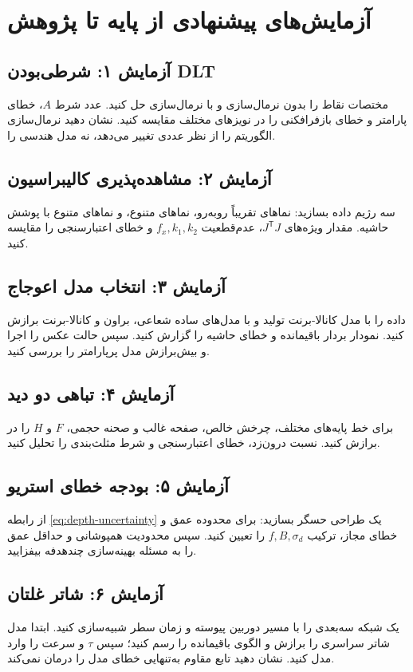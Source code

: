 \documentclass[12pt,openany,oneside]{book}
\newcommand{\trans}{^{\mathsf T}}
\begin{document}
\section{آزمایش‌های پیشنهادی از پایه تا پژوهش}

\subsection{آزمایش ۱: شرطی‌بودن DLT}
مختصات نقاط را بدون نرمال‌سازی و با نرمال‌سازی حل کنید. عدد شرط \(A\)، خطای پارامتر و خطای بازفرافکنی را در نویزهای مختلف
مقایسه کنید. نشان دهید نرمال‌سازی الگوریتم را از نظر عددی تغییر می‌دهد، نه مدل هندسی را.

\subsection{آزمایش ۲: مشاهده‌پذیری کالیبراسیون}
سه رژیم داده بسازید: نماهای تقریباً روبه‌رو، نماهای متنوع، و نماهای متنوع با پوشش حاشیه. مقدار ویژه‌های \(J\trans J\)،
عدم‌قطعیت \(f_x,k_1,k_2\) و خطای اعتبارسنجی را مقایسه کنید.

\subsection{آزمایش ۳: انتخاب مدل اعوجاج}
داده را با مدل کانالا-برنت تولید و با مدل‌های ساده شعاعی، براون و کانالا-برنت برازش کنید. نمودار بردار باقیمانده و خطای
حاشیه را گزارش کنید. سپس حالت عکس را اجرا و بیش‌برازش مدل پرپارامتر را بررسی کنید.

\subsection{آزمایش ۴: تباهی دو دید}
برای خط پایه‌های مختلف، چرخش خالص، صفحه غالب و صحنه حجمی، \(F\) و \(H\) را در  برازش کنید. نسبت درون‌زد،
خطای اعتبارسنجی و شرط مثلث‌بندی را تحلیل کنید.

\subsection{آزمایش ۵: بودجه خطای استریو}
از رابطه \eqref{eq:depth-uncertainty} یک طراحی حسگر بسازید: برای محدوده عمق و خطای مجاز، ترکیب \(f,B,\sigma_d\) را تعیین کنید.
سپس محدودیت همپوشانی و حداقل عمق را به مسئله بهینه‌سازی چندهدفه بیفزایید.

\subsection{آزمایش ۶: شاتر غلتان}
یک شبکه سه‌بعدی را با مسیر دوربین پیوسته و زمان سطر شبیه‌سازی کنید. ابتدا مدل شاتر سراسری را برازش و الگوی باقیمانده را
رسم کنید؛ سپس \(\tau\) و سرعت را وارد مدل کنید. نشان دهید تابع مقاوم به‌تنهایی خطای مدل را درمان نمی‌کند.
\end{document}
